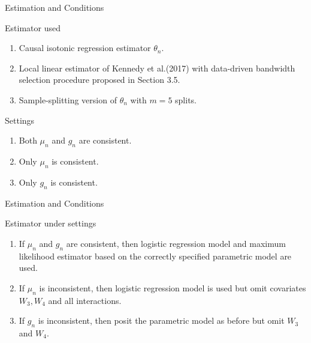 \documentclass{beamer}
\begin{document}
\begin{frame}{Estimation and Conditions}

\begin{block}{Estimator used}
	\begin{enumerate}
	\item	Causal isotonic regression estimator $\theta_n$.
	\item	Local linear estimator of Kennedy et al.(2017) with data-driven bandwidth selection procedure proposed in Section 3.5.
	\item	Sample-splitting version of $\theta_n$ with $m=5$ splits.
	\end{enumerate}
\end{block}

\begin{block}{Settings}
	\begin{enumerate}
	\item Both $\mu_n$ and $g_n$ are consistent.
	\item Only $\mu_n$ is consistent.
	\item Only $g_n$ is consistent.
	\end{enumerate}
\end{block}

\end{frame}


\begin{frame}{Estimation and Conditions}

\begin{block}{Estimator under settings}
	\begin{enumerate}
	\item If $\mu_n$ and $g_n$ are consistent, then logistic regression model and maximum likelihood estimator based on the correctly specified parametric model are used.
	\item If $\mu_n$ is inconsistent, then logistic regression model is used but omit covariates $W_3,W_4$ and all interactions.
	\item If $g_n$ is inconsistent, then posit the parametric model as before but omit $W_3$ and $W_4$.
	\end{enumerate}
\end{block}

\end{frame}


\end{document}
